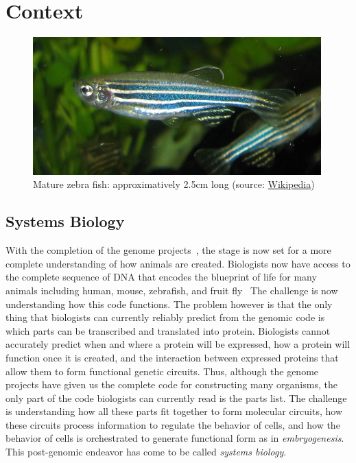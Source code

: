 
\chapter{Context}

\begin{figure}[htb]
\begin{center}
\leavevmode
\includegraphics[width=0.99\textwidth]{pictures/zebrafishPic}
\end{center}
\caption{Mature zebra fish: approximatively 2.5cm long (source: \href{http://en.wikipedia.org/wiki/File:Zebrafisch.jpg}{Wikipedia})}
\label{fig:ZebraPic}
\end{figure}

\section{Systems Biology}

With the completion of the genome projects~\cite{}, the stage is now set for a
more complete understanding of how animals are created. Biologists now have
access to the complete sequence of DNA that encodes the blueprint of life for
many animals including human, mouse, zebrafish, and fruit
fly~\cite{[2][3][4][5]} The challenge is now understanding how this
code functions. The problem however is that the only thing that biologists can
currently reliably predict from the genomic code is which parts can be
transcribed and translated into protein. Biologists cannot accurately predict
when and where a protein will be expressed, how a protein will
function once it is created, and the interaction between expressed proteins that
allow them to form functional genetic circuits. Thus, although the genome
projects have given us the complete code for constructing many organisms, the
only part of the code biologists can currently read is the parts list. The
challenge is understanding how all these parts fit together to form molecular
circuits, how these circuits process information to regulate the behavior of
cells, and how the behavior of cells is orchestrated to generate functional form
as in \emph{embryogenesis}. This post-genomic endeavor has come to be called
\emph{systems biology}.\\

